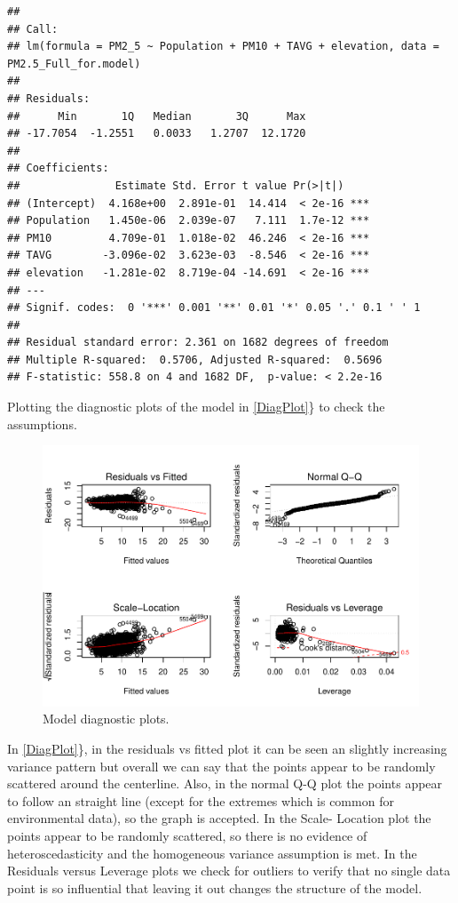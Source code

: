 \documentclass[12pt,]{article}
\begin{document}
\begin{verbatim}
## 
## Call:
## lm(formula = PM2_5 ~ Population + PM10 + TAVG + elevation, data = PM2.5_Full_for.model)
## 
## Residuals:
##      Min       1Q   Median       3Q      Max 
## -17.7054  -1.2551   0.0033   1.2707  12.1720 
## 
## Coefficients:
##               Estimate Std. Error t value Pr(>|t|)    
## (Intercept)  4.168e+00  2.891e-01  14.414  < 2e-16 ***
## Population   1.450e-06  2.039e-07   7.111  1.7e-12 ***
## PM10         4.709e-01  1.018e-02  46.246  < 2e-16 ***
## TAVG        -3.096e-02  3.623e-03  -8.546  < 2e-16 ***
## elevation   -1.281e-02  8.719e-04 -14.691  < 2e-16 ***
## ---
## Signif. codes:  0 '***' 0.001 '**' 0.01 '*' 0.05 '.' 0.1 ' ' 1
## 
## Residual standard error: 2.361 on 1682 degrees of freedom
## Multiple R-squared:  0.5706, Adjusted R-squared:  0.5696 
## F-statistic: 558.8 on 4 and 1682 DF,  p-value: < 2.2e-16
\end{verbatim}

Plotting the diagnostic plots of the model in \autoref{DiagPlot}\} to
check the assumptions.

\begin{figure}
\centering
\includegraphics{Raby_ENV872_Project_files/figure-latex/unnamed-chunk-59-1.pdf}
\caption{Model diagnostic plots. \label{DiagPlot}}
\end{figure}

In \autoref{DiagPlot}\}, in the residuals vs fitted plot it can be seen
an slightly increasing variance pattern but overall we can say that the
points appear to be randomly scattered around the centerline. Also, in
the normal Q-Q plot the points appear to follow an straight line (except
for the extremes which is common for environmental data), so the graph
is accepted. In the Scale- Location plot the points appear to be
randomly scattered, so there is no evidence of heteroscedasticity and
the homogeneous variance assumption is met. In the Residuals versus
Leverage plots we check for outliers to verify that no single data point
is so influential that leaving it out changes the structure of the
model.
\end{document}
